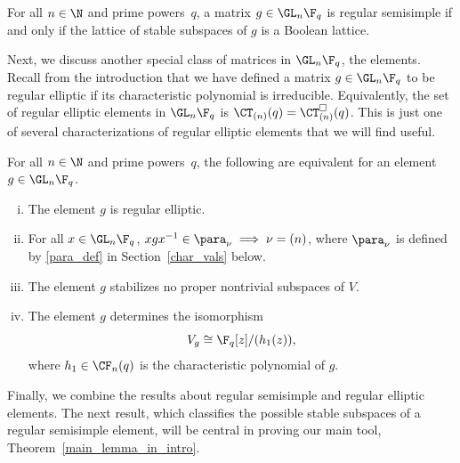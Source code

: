 \begin{theorem} \label{helpful}
For all \(n \in \N\) and prime powers~\(q\), a matrix \(g \in \GL_n \F_q\) is regular semisimple if and only if the lattice of stable subspaces of \(g\) is a Boolean lattice.
\end{theorem}




Next, we discuss another special class of matrices in $\GL_n \F_q$, the  elements.
Recall from the introduction that we have defined a matrix \(g \in \GL_n \F_q\) to be regular elliptic if its characteristic polynomial is irreducible.
Equivalently, the set of regular elliptic elements in \(\GL_n \F_q\) is \(\CT_{(n)} (q) = \CT_{(n)}^\Box (q)\).
This is just one of several characterizations of regular elliptic elements that we will find useful.

\begin{proposition}
\label{reg_ell_char}
For all \(n \in \N\) and prime powers~\(q\), the following are equivalent for an element $g \in \GL_n \F_q$.
\begin{enumerate}[(i)]
\item The element $g$ is regular elliptic.
\item For all $x \in \GL_n \F_q$, $xgx^{-1} \in \para_\nu \implies \nu = (n)$, where \(\para_\nu\) is defined by \eqref{para_def} in Section~\ref{char_vals} below.
\item \label{no_stability} The element \(g\) stabilizes no proper nontrivial subspaces of \(V\).
\item The element \(g\) determines the isomorphism
\begin{equation}
\label{re_rcf}
V_g
\cong
\F_q[z] / (h_1(z)),
\end{equation}
where \(h_1 \in \CF_n (q)\) is the characteristic polynomial of \(g\).
\end{enumerate}
\end{proposition}


Finally, we combine the results about regular semisimple and regular elliptic elements.
The next result, which classifies the possible stable subspaces of a regular semisimple element, will be central in proving our main tool, Theorem~\ref{main_lemma_in_intro}.

